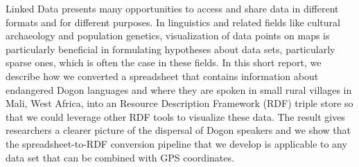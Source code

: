 
Linked Data presents many opportunities to access and share data in different formats and for different purposes. In linguistics and related fields like cultural archaeology and population genetics, visualization of data points on maps is particularly beneficial in formulating hypotheses about data sets, particularly sparse ones, which is often the case in these fields. In this short report, we describe how we converted a spreadsheet that contains information about endangered Dogon languages and where they are spoken in small rural villages in Mali, West Africa, into an Resource Description Framework (RDF) triple store so that we could leverage other RDF tools to visualize these data. The result gives researchers a clearer picture of the dispersal of Dogon speakers and we show that the spreadsheet-to-RDF conversion pipeline that we develop is applicable to any data set that can be combined with GPS coordinates.
